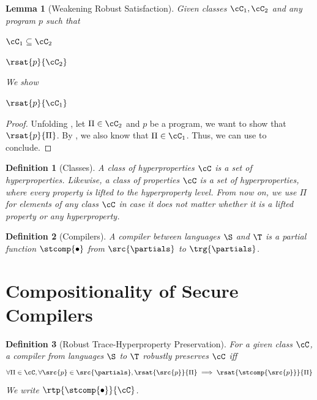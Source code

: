 \documentclass[a4paper,names,dvipsnames]{article}
\newtheorem{definition}{Definition}
\newtheorem{lemma}{Lemma}
\begin{document}
\begin{lemma}[Weakening Robust Satisfaction]\label{lem:weaken-rsat}
  Given classes $\cC_{1}, \cC_{2}$ and any program $p$ such that
  \begin{assumptions}
    \item\label{lem:weaken-rsat:ass:a} $\cC_{1}\subseteq\cC_{2}$
    \item\label{lem:weaken-rsat:ass:b} $\rsat{p}{\cC_{2}}$
  \end{assumptions}
  We show
  \begin{goals}
    \item\label{lem:weaken-rsat:goal:i} $\rsat{p}{\cC_{1}}$
  \end{goals}
\end{lemma}
\begin{proof}
  Unfolding , let $\Pi\in\cC_{2}$ and $p$ be a program, we want to show that $\rsat{p}{\Pi}$.
  By , we also know that $\Pi\in\cC_{1}$.
  Thus, we can use  to conclude.
\end{proof}

\begin{definition}[Classes]
  A class of hyperproperties $\cC$ is a set of hyperproperties.
  Likewise, a class of properties $\cC$ is a set of hyperproperties, where every property is lifted to the hyperproperty level.
  From now on, we use $\Pi$ for elements of any class $\cC$ in case it does not matter whether it is a lifted property or any hyperproperty.
\end{definition}

\begin{definition}[Compilers]
  A compiler between languages $\S$ and $\T$ is a partial function $\stcomp{\bullet}$ from $\src{\partials}$ to $\trg{\partials}$.
\end{definition}

\section{Compositionality of Secure Compilers}

\begin{definition}[Robust Trace-Hyperproperty Preservation]\label{def:rtp}
  For a given class $\cC$, a compiler from languages $\S$ to $\T$ robustly preserves $\cC$ iff
  $$
  \forall\Pi\in\cC,\forall\src{p}\in\src{\partials},\rsat{\src{p}}{\Pi}\implies\rsat{\stcomp{\src{p}}}{\Pi}
  $$
  We write $\rtp{\stcomp{\bullet}}{\cC}$.
\end{definition}
\end{document}
